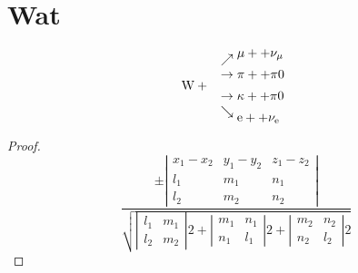 \documentclass{article} %
\begin{document}
\section{Wat}

\begin{displaymath}
\mbox{W}+\
\begin{array}{l}
\nearrow\raise5pt\hbox{$\mu+ + \nu_{\mu}$}\\
\rightarrow \pi+ +\pi0 \\[5pt]
\rightarrow \kappa+ +\pi0 \\
\searrow\lower5pt\hbox{$\mathrm{e}+
+\nu_{\scriptstyle\mathrm{e}}$}
\end{array}
\end{displaymath}

\begin{proof}
\begin{displaymath}
\frac{\pm
\left|\begin{array}{ccc}
x_1-x_2 & y_1-y_2 & z_1-z_2 \\
l_1 & m_1 & n_1 \\
l_2 & m_2 & n_2
\end{array}\right|}{
\sqrt{\left|\begin{array}{cc}l_1&m_1\\
l_2&m_2\end{array}\right|2
+ \left|\begin{array}{cc}m_1&n_1\\
n_1&l_1\end{array}\right|2
+ \left|\begin{array}{cc}m_2&n_2\\
n_2&l_2\end{array}\right|2}}
\end{displaymath}
\end{proof}

\end{document}
